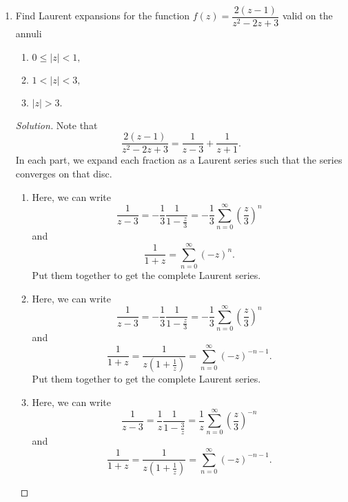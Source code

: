 \documentclass[12pt]{article}
\theoremstyle{definition}
\newenvironment{soln}{\begin{proof}[Solution]}{\end{proof}}
\begin{document}
\begin{enumerate}[leftmargin=*]
	\item Find Laurent expansions for the function $f(z) = \dfrac{2(z - 1)}{z^2 - 2z + 3}$ valid on the annuli
	\begin{enumerate}
		\item $0 \le \left|z\right| < 1,$
		\item $1 < |z| < 3,$
		\item $|z| > 3.$
	\end{enumerate}
	\begin{soln}
	Note that
	\begin{equation*} 
		\dfrac{2(z - 1)}{z^2 - 2z + 3} = \dfrac{1}{z - 3} + \dfrac{1}{z + 1}.
	\end{equation*}
	In each part, we expand each fraction as a Laurent series such that the series converges on that disc.
	\begin{enumerate}
		\item Here, we can write
		\begin{equation*} 
			\dfrac{1}{z - 3} = -\dfrac{1}{3}\dfrac{1}{1 - \frac{z}{3}} = -\dfrac{1}{3}\sum_{n = 0}^{\infty}\left(\dfrac{z}{3}\right)^n
		\end{equation*}
		and
		\begin{equation*} 
			\dfrac{1}{1 + z} = \sum_{n = 0}^{\infty}(-z)^n.
		\end{equation*}
		Put them together to get the complete Laurent series. 
		\item Here, we can write
		\begin{equation*} 
			\dfrac{1}{z - 3} = -\dfrac{1}{3}\dfrac{1}{1 - \frac{z}{3}} = -\dfrac{1}{3}\sum_{n = 0}^{\infty}\left(\dfrac{z}{3}\right)^n
		\end{equation*}
		and
		\begin{equation*} 
			\dfrac{1}{1 + z} = \dfrac{1}{z\left(1 + \frac{1}{z}\right)} = \sum_{n = 0}^{\infty}(-z)^{-n - 1}.
		\end{equation*}
		Put them together to get the complete Laurent series. 
		\item Here, we can write
		\begin{equation*} 
			\dfrac{1}{z - 3} = \dfrac{1}{z}\dfrac{1}{1 - \frac{3}{z}} = \dfrac{1}{z}\sum_{n = 0}^{\infty}\left(\dfrac{z}{3}\right)^{-n}
		\end{equation*}
		and
		\begin{equation*} 
			\dfrac{1}{1 + z} = \dfrac{1}{z\left(1 + \frac{1}{z}\right)} = \sum_{n = 0}^{\infty}(-z)^{-n - 1}.
		\end{equation*}

\end{enumerate}
\end{soln}
\end{enumerate}
\end{document}
